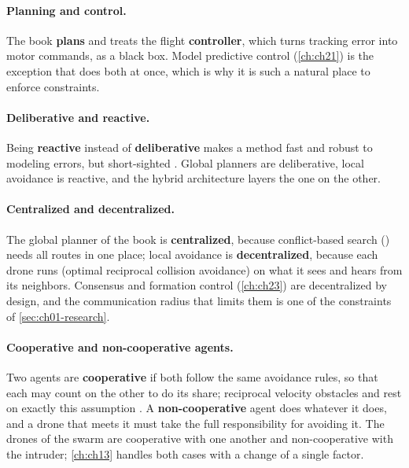 \paragraph{Planning and control.}
The book \textbf{plans} and treats the flight
\textbf{controller}, which turns tracking error into motor commands, as
a black box. Model predictive control (\cref{ch:ch21}) is the exception that does both at
once, which is why it is such a natural place to enforce constraints.

\paragraph{Deliberative and reactive.}
Being \textbf{reactive} instead of
\textbf{deliberative} makes a method fast and robust to modeling
errors, but short-sighted \cite{russell2020aima}. Global planners are deliberative,
local avoidance is reactive, and the hybrid architecture layers the one on the other.

\paragraph{Centralized and decentralized.}
The global planner of the book is \textbf{centralized}, because
conflict-based search (\cbs) needs all routes in one place; local avoidance is
\textbf{decentralized}, because each drone runs \orca (optimal
reciprocal collision avoidance) on what it sees and hears from its neighbors.
Consensus and formation control (\cref{ch:ch23}) are decentralized by design, and the
communication radius that limits them is one of the constraints of
\cref{sec:ch01-research}.

\paragraph{Cooperative and non-cooperative agents.}
Two agents are \textbf{cooperative} if both follow the same
avoidance rules, so that each may count on the other to do its share; reciprocal
velocity obstacles and \orca rest on exactly this assumption \cite{vandenberg2011orca}.
A \textbf{non-cooperative} agent does whatever it does,
and a drone that meets it must take the full responsibility for avoiding it. The
drones of the swarm are cooperative with one another and non-cooperative with the
intruder; \cref{ch:ch13} handles both cases with a change of a single factor.

